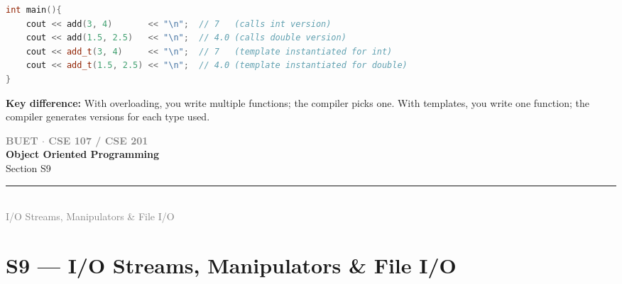 \documentclass[12pt,a3paper]{article}
\newcommand{\secdivider}[4]{%
  \newpage\thispagestyle{empty}%
  \vspace*{\fill}%
  \begin{tcolorbox}[enhanced,colback=#4!7,colframe=#3,boxrule=1.5pt,arc=8pt,
    left=20pt,right=20pt,top=22pt,bottom=22pt,
    shadow={3pt}{-3pt}{0pt}{black!15}]
    \centering
    {\large\textcolor{gray}{\textbf{BUET $\cdot$ CSE 107 / CSE 201}}}\\[8pt]
    {\fontsize{26}{32}\selectfont\bfseries\textcolor{#3}{Object Oriented Programming}}\\[6pt]
    {\fontsize{15}{19}\selectfont\textcolor{dgray}{#1}}\\[12pt]
    \textcolor{#3!60}{\rule{0.5\textwidth}{0.5pt}}\\[6pt]
    {\small\textcolor{gray}{#2}}
  \end{tcolorbox}%
  \vspace*{\fill}\newpage%
}
\begin{document}
\begin{enumerate}
\begin{tcolorbox}
\begin{lstlisting}[language=C++]
int main(){
    cout << add(3, 4)       << "\n";  // 7   (calls int version)
    cout << add(1.5, 2.5)   << "\n";  // 4.0 (calls double version)
    cout << add_t(3, 4)     << "\n";  // 7   (template instantiated for int)
    cout << add_t(1.5, 2.5) << "\n";  // 4.0 (template instantiated for double)
}
\end{lstlisting}

\textbf{Key difference:} With overloading, you write multiple
functions; the compiler picks one.  With templates, you write one
function; the compiler generates versions for each type used.

\end{tcolorbox}





\end{enumerate}

\secdivider{Section S9}{I/O Streams, Manipulators \& File I/O}{cA}{cA}
\label{sec:S9}
\titleformat{\section}{\large\bfseries\color{cA}}{}{0em}{}[\titlerule]
\section{S9 --- I/O Streams, Manipulators \& File I/O}
\end{document}
